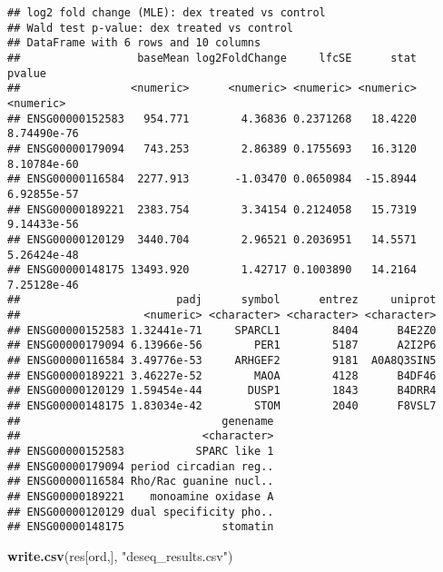 \documentclass[
]{article}
\newenvironment{Shaded}{\begin{snugshade}}{\end{snugshade}}
\newcommand{\AttributeTok}[1]{\textcolor[rgb]{0.13,0.29,0.53}{#1}}
\newcommand{\CommentTok}[1]{\textcolor[rgb]{0.56,0.35,0.01}{\textit{#1}}}
\newcommand{\FunctionTok}[1]{\textcolor[rgb]{0.13,0.29,0.53}{\textbf{#1}}}
\newcommand{\NormalTok}[1]{#1}
\newcommand{\OtherTok}[1]{\textcolor[rgb]{0.56,0.35,0.01}{#1}}
\newcommand{\SpecialCharTok}[1]{\textcolor[rgb]{0.81,0.36,0.00}{\textbf{#1}}}
\newcommand{\StringTok}[1]{\textcolor[rgb]{0.31,0.60,0.02}{#1}}
\begin{document}
\begin{Shaded}
\end{Shaded}

\begin{verbatim}
## log2 fold change (MLE): dex treated vs control 
## Wald test p-value: dex treated vs control 
## DataFrame with 6 rows and 10 columns
##                  baseMean log2FoldChange     lfcSE      stat      pvalue
##                 <numeric>      <numeric> <numeric> <numeric>   <numeric>
## ENSG00000152583   954.771        4.36836 0.2371268   18.4220 8.74490e-76
## ENSG00000179094   743.253        2.86389 0.1755693   16.3120 8.10784e-60
## ENSG00000116584  2277.913       -1.03470 0.0650984  -15.8944 6.92855e-57
## ENSG00000189221  2383.754        3.34154 0.2124058   15.7319 9.14433e-56
## ENSG00000120129  3440.704        2.96521 0.2036951   14.5571 5.26424e-48
## ENSG00000148175 13493.920        1.42717 0.1003890   14.2164 7.25128e-46
##                        padj      symbol      entrez     uniprot
##                   <numeric> <character> <character> <character>
## ENSG00000152583 1.32441e-71     SPARCL1        8404      B4E2Z0
## ENSG00000179094 6.13966e-56        PER1        5187      A2I2P6
## ENSG00000116584 3.49776e-53     ARHGEF2        9181  A0A8Q3SIN5
## ENSG00000189221 3.46227e-52        MAOA        4128      B4DF46
## ENSG00000120129 1.59454e-44       DUSP1        1843      B4DRR4
## ENSG00000148175 1.83034e-42        STOM        2040      F8VSL7
##                               genename
##                            <character>
## ENSG00000152583           SPARC like 1
## ENSG00000179094 period circadian reg..
## ENSG00000116584 Rho/Rac guanine nucl..
## ENSG00000189221    monoamine oxidase A
## ENSG00000120129 dual specificity pho..
## ENSG00000148175               stomatin
\end{verbatim}

\begin{Shaded}
\begin{Highlighting}[]
\FunctionTok{write.csv}\NormalTok{(res[ord,], }\StringTok{"deseq\_results.csv"}\NormalTok{)}
\end{Highlighting}
\end{Shaded}

\begin{Shaded}
\end{Shaded}
\end{document}
